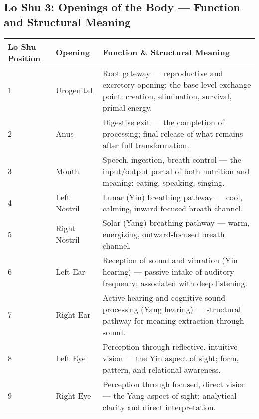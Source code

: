 \documentclass{article}
\begin{document}
\begin{landscape}

\section*{Lo Shu 3: Openings of the Body — Function and Structural Meaning}

\renewcommand{\arraystretch}{1.4}

\begin{tabular}{|p{1.8cm}|p{4.5cm}|p{9.5cm}|}
\hline
\textbf{Lo Shu Position} & 
\textbf{Opening} & 
\textbf{Function \& Structural Meaning} \\
\hline

1 & 
Urogenital & 
Root gateway — reproductive and excretory opening; the base-level exchange point: creation, elimination, survival, primal energy. \\
\hline

2 & 
Anus & 
Digestive exit — the completion of processing; final release of what remains after full transformation. \\
\hline

3 & 
Mouth & 
Speech, ingestion, breath control — the input/output portal of both nutrition and meaning: eating, speaking, singing. \\
\hline

4 & 
Left Nostril & 
Lunar (Yin) breathing pathway — cool, calming, inward-focused breath channel. \\
\hline

5 & 
Right Nostril & 
Solar (Yang) breathing pathway — warm, energizing, outward-focused breath channel. \\
\hline

6 & 
Left Ear & 
Reception of sound and vibration (Yin hearing) — passive intake of auditory frequency; associated with deep listening. \\
\hline

7 & 
Right Ear & 
Active hearing and cognitive sound processing (Yang hearing) — structural pathway for meaning extraction through sound. \\
\hline

8 & 
Left Eye & 
Perception through reflective, intuitive vision — the Yin aspect of sight; form, pattern, and relational awareness. \\
\hline

9 & 
Right Eye & 
Perception through focused, direct vision — the Yang aspect of sight; analytical clarity and direct interpretation. \\
\hline

\end{tabular}

\end{landscape}
\end{document}
